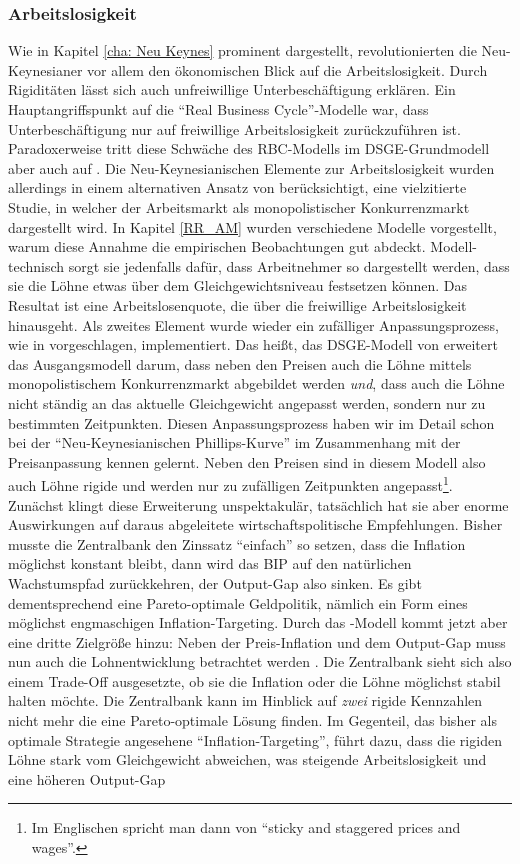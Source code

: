 \subsubsection{Arbeitslosigkeit}
Wie in Kapitel \ref{cha: Neu Keynes} prominent dargestellt, revolutionierten die Neu-Keynesianer vor allem den ökonomischen Blick auf die Arbeitslosigkeit. Durch Rigiditäten lässt sich auch unfreiwillige Unterbeschäftigung erklären. Ein Hauptangriffspunkt auf die "`Real Business Cycle"'-Modelle war, dass Unterbeschäftigung nur auf freiwillige Arbeitslosigkeit zurückzuführen ist. Paradoxerweise tritt diese Schwäche des RBC-Modells im DSGE-Grundmodell aber auch auf \parencite[S. 1]{Blanchard2010}. Die Neu-Keynesianischen Elemente zur Arbeitslosigkeit wurden allerdings in einem alternativen Ansatz von \textcite{Erceg2000} berücksichtigt, eine vielzitierte Studie, in welcher der Arbeitsmarkt als monopolistischer Konkurrenzmarkt dargestellt wird. In Kapitel \ref{RR_AM} wurden verschiedene Modelle vorgestellt, warum diese Annahme die empirischen Beobachtungen gut abdeckt. Modell-technisch sorgt sie jedenfalls dafür, dass Arbeitnehmer so dargestellt werden, dass sie die Löhne etwas über dem Gleichgewichtsniveau festsetzen können. Das Resultat ist eine Arbeitslosenquote, die über die freiwillige Arbeitslosigkeit hinausgeht. Als zweites Element wurde wieder ein zufälliger Anpassungsprozess, wie in \textcite{Calvo1983} vorgeschlagen, implementiert. Das heißt, das DSGE-Modell von \textcite{Erceg2000} erweitert das Ausgangsmodell darum, dass neben den Preisen auch die Löhne mittels monopolistischem Konkurrenzmarkt abgebildet werden \textit{und}, dass auch die Löhne nicht ständig an das aktuelle Gleichgewicht angepasst werden, sondern nur zu bestimmten Zeitpunkten. Diesen Anpassungsprozess haben wir im Detail schon bei der "`Neu-Keynesianischen Phillips-Kurve"' im Zusammenhang mit der Preisanpassung kennen gelernt. Neben den Preisen sind in diesem Modell also auch Löhne rigide und werden nur zu zufälligen Zeitpunkten angepasst\footnote{Im Englischen spricht man dann von "`sticky and staggered prices and wages"'.}. Zunächst klingt diese Erweiterung unspektakulär, tatsächlich hat sie aber enorme Auswirkungen auf daraus abgeleitete wirtschaftspolitische Empfehlungen. Bisher musste die Zentralbank den Zinssatz "`einfach"' so setzen, dass die Inflation möglichst konstant bleibt, dann wird das BIP auf den natürlichen Wachstumspfad zurückkehren, der Output-Gap also sinken. Es gibt dementsprechend eine Pareto-optimale Geldpolitik, nämlich ein Form eines möglichst engmaschigen Inflation-Targeting. Durch das \textcite{Erceg2000}-Modell kommt jetzt aber eine dritte Zielgröße hinzu: Neben der Preis-Inflation und dem Output-Gap muss nun auch die Lohnentwicklung betrachtet werden \parencite[S. 282]{Erceg2000}. Die Zentralbank sieht sich also einem Trade-Off ausgesetzte, ob sie die Inflation oder die Löhne möglichst stabil halten möchte. Die Zentralbank kann im Hinblick auf \textit{zwei} rigide Kennzahlen nicht mehr die eine Pareto-optimale Lösung finden. Im Gegenteil, das bisher als optimale Strategie angesehene "`Inflation-Targeting"', führt dazu, dass die rigiden Löhne stark vom Gleichgewicht abweichen, was steigende Arbeitslosigkeit und eine höheren Output-Gap 